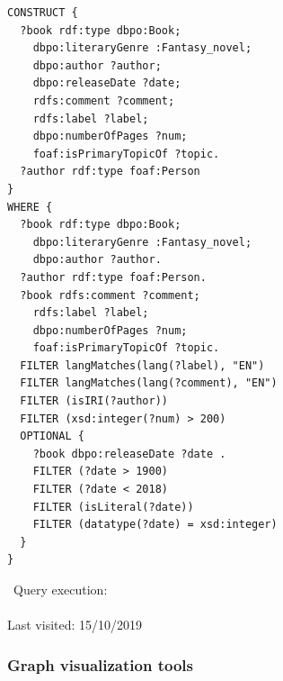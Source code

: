 \noindent
\begin{minipage}[c]{0.7\linewidth}
\begin{lstlisting}[caption={SPARQL \texttt{CONSTRUCT} that identifies in DBpedia the Fantasy-genre books written between 1900 and 2018 having more than 200 pages.},label={listing:fantasy}]
CONSTRUCT {
  ?book rdf:type dbpo:Book; 
    dbpo:literaryGenre :Fantasy_novel;
    dbpo:author ?author;
    dbpo:releaseDate ?date;
    rdfs:comment ?comment;
    rdfs:label ?label;
    dbpo:numberOfPages ?num;
    foaf:isPrimaryTopicOf ?topic.
  ?author rdf:type foaf:Person 
}
WHERE {
  ?book rdf:type dbpo:Book;
    dbpo:literaryGenre :Fantasy_novel;
    dbpo:author ?author.
  ?author rdf:type foaf:Person.
  ?book rdfs:comment ?comment;
    rdfs:label ?label;
    dbpo:numberOfPages ?num;
    foaf:isPrimaryTopicOf ?topic.
  FILTER langMatches(lang(?label), "EN")
  FILTER langMatches(lang(?comment), "EN")
  FILTER (isIRI(?author))
  FILTER (xsd:integer(?num) > 200)
  OPTIONAL {
    ?book dbpo:releaseDate ?date .
    FILTER (?date > 1900)
    FILTER (?date < 2018)
    FILTER (isLiteral(?date))
    FILTER (datatype(?date) = xsd:integer)
  }
} 
\end{lstlisting}
\end{minipage} %
\begin{minipage}[c]{0.3\linewidth}
\noindent
\begin{center}
\faQrcode~\textsf{Query execution:}\\
\vspace*{0.2cm}
\\
\tiny{\textsf{Last visited: 15/10/2019}}
\end{center}
\end{minipage}
\subsubsection{\textsf{Graph visualization tools}}

